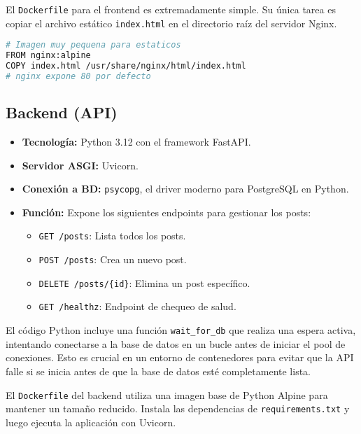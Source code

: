 \documentclass[12pt, a4paper]{article}
\begin{document}
El \texttt{Dockerfile} para el frontend es extremadamente simple. Su única tarea es copiar el archivo estático \texttt{index.html} en el directorio raíz del servidor Nginx.

\begin{lstlisting}[language=bash, caption={Dockerfile del Frontend}]
# Imagen muy pequena para estaticos
FROM nginx:alpine
COPY index.html /usr/share/nginx/html/index.html
# nginx expone 80 por defecto
\end{lstlisting}

\subsection{Backend (API)}
\begin{itemize}
    \item \textbf{Tecnología:} Python 3.12 con el framework FastAPI.
    \item \textbf{Servidor ASGI:} Uvicorn.
    \item \textbf{Conexión a BD:} \texttt{psycopg}, el driver moderno para PostgreSQL en Python.
    \item \textbf{Función:} Expone los siguientes endpoints para gestionar los posts:
    \begin{itemize}
        \item \texttt{GET /posts}: Lista todos los posts.
        \item \texttt{POST /posts}: Crea un nuevo post.
        \item \texttt{DELETE /posts/\{id\}}: Elimina un post específico.
        \item \texttt{GET /healthz}: Endpoint de chequeo de salud.
    \end{itemize}
\end{itemize}

El código Python incluye una función \texttt{wait\_for\_db} que realiza una espera activa, intentando conectarse a la base de datos en un bucle antes de iniciar el pool de conexiones. Esto es crucial en un entorno de contenedores para evitar que la API falle si se inicia antes de que la base de datos esté completamente lista.

El \texttt{Dockerfile} del backend utiliza una imagen base de Python Alpine para mantener un tamaño reducido. Instala las dependencias de \texttt{requirements.txt} y luego ejecuta la aplicación con Uvicorn.
\end{document}
